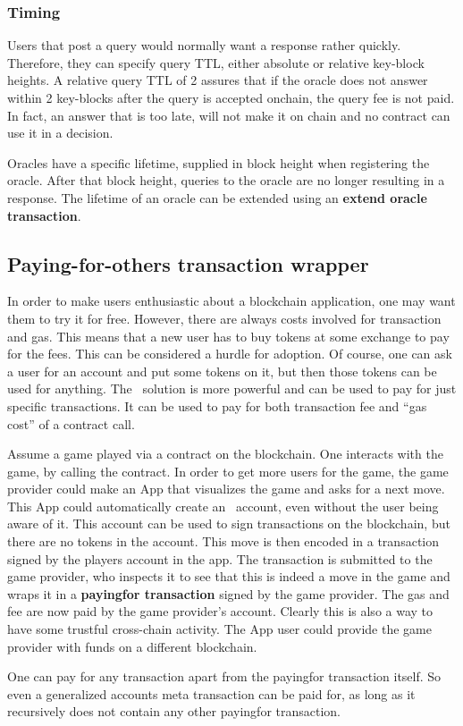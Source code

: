 \subsubsection{Timing}

Users that post a query would normally want a response rather
quickly. Therefore, they can specify query TTL, either absolute
or relative key-block heights. A relative query TTL of 2 assures
that if the oracle does not answer within 2 key-blocks after the query
is accepted onchain, the query fee is not paid. In fact, an answer that is too
late, will not make it on chain and no contract can use it in a
decision.

Oracles have a specific lifetime, supplied in block height when
registering the oracle. After that block height, queries to the oracle
are no longer resulting in a response. The lifetime of an oracle can
be extended using an \textbf{extend oracle transaction}.


\subsection{Paying-for-others transaction wrapper}
\label{sect:payingfor}

In order to make users enthusiastic about a blockchain application,
one may want them to try it for free. However, there are always costs
involved for transaction and gas. This means that a new user has to
buy tokens at some exchange to pay for the fees. This can be considered
a hurdle for adoption. Of course, one can ask a user for an account and put
some tokens on it, but then those tokens can be used for anything.
The \aet\ solution is more powerful and can be used to pay for
just specific transactions. It can be used to pay for both transaction
fee and \enquote{gas cost} of a contract call.

Assume a game played via a contract on the blockchain. One interacts
with the game, by calling the contract. In order to get more users for
the game, the game provider could make an App that visualizes
the game and asks for a next move. This App could automatically create
an \aet\ account, even without the user being aware of it. This
account can be used to sign transactions on the blockchain, but there
are no tokens in the account. This move is then encoded in a
transaction signed by the players account in the app. The transaction
is submitted to the game provider, who inspects it to see that this
is indeed a move in the game and wraps it in a \textbf{payingfor
  transaction} signed by the game provider. The gas and fee are now
paid by the game provider's account.
Clearly this is also a way to have some trustful cross-chain
activity. The App user could provide the game provider with funds on a
different blockchain.

One can pay for any transaction apart from the payingfor transaction
itself. So even a generalized accounts meta transaction can be paid
for, as long as it recursively does not contain any other payingfor
transaction.
